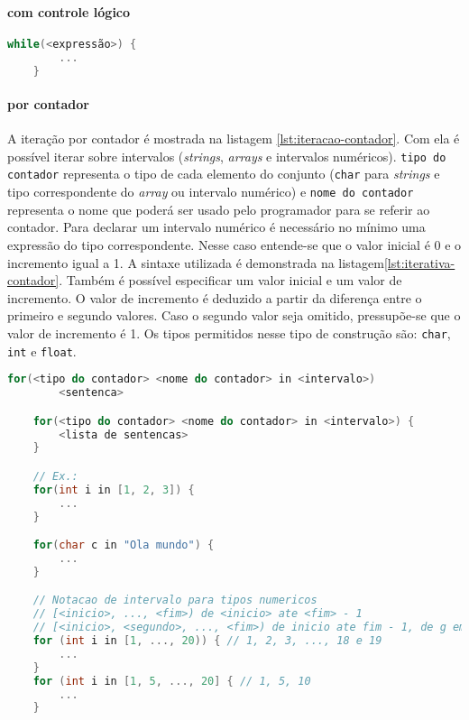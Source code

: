 \paragraph{com controle lógico}
\begin{lstlisting}[language=C, caption=Estrutura iterativa com controle lógico, label=lst:iterativa-logico]
    while(<expressão>) {
        ...
    }
\end{lstlisting}

\paragraph{por contador}
A iteração por contador é mostrada na listagem \ref{lst:iteracao-contador}.
Com ela é possível iterar sobre intervalos (\textit{strings}, \textit{arrays} e intervalos numéricos).
\texttt{tipo do contador} representa o tipo de cada elemento do conjunto (\texttt{char} para \textit{strings} e
tipo correspondente do \textit{array} ou intervalo numérico) e \texttt{nome do contador} representa o nome que
poderá ser usado pelo programador para se referir ao contador.
Para declarar um intervalo numérico é necessário no mínimo uma expressão do tipo correspondente.
Nesse caso entende-se que o valor inicial é 0 e o incremento igual a 1.
A sintaxe utilizada é demonstrada na listagem\ref{lst:iterativa-contador}.
Também é possível especificar um valor inicial e um valor de incremento.
O valor de incremento é deduzido a partir da diferença entre o primeiro e segundo valores.
Caso o segundo valor seja omitido, pressupõe-se que o valor de incremento é 1.
Os tipos permitidos nesse tipo de construção são: \texttt{char}, \texttt{int} e \texttt{float}.

\begin{lstlisting}[language=C, caption=Estrutura iterativa por contador, label=lst:iterativa-contador]
    for(<tipo do contador> <nome do contador> in <intervalo>)
        <sentenca>

    for(<tipo do contador> <nome do contador> in <intervalo>) {
        <lista de sentencas>
    }

    // Ex.:
    for(int i in [1, 2, 3]) {
        ...
    }

    for(char c in "Ola mundo") {
        ...
    }

    // Notacao de intervalo para tipos numericos
    // [<inicio>, ..., <fim>) de <inicio> ate <fim> - 1
    // [<inicio>, <segundo>, ..., <fim>) de inicio ate fim - 1, de g em g, onde g eh igual a (<segundo> - <inicio>)
    for (int i in [1, ..., 20)) { // 1, 2, 3, ..., 18 e 19
        ...
    }
    for (int i in [1, 5, ..., 20] { // 1, 5, 10
        ...
    }
\end{lstlisting}

